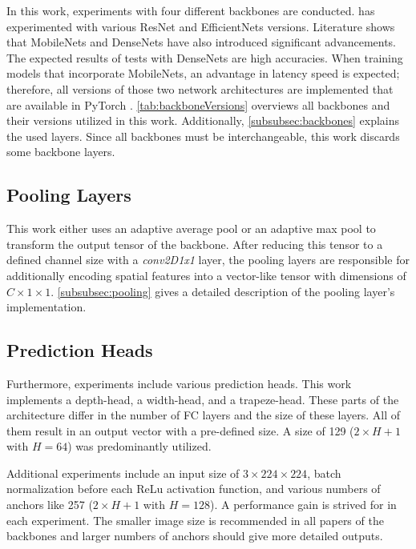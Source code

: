 In this work, experiments with four different backbones are conducted.
\cite{tepNet2024} has experimented with various ResNet and EfficientNets versions.
Literature shows that MobileNets and DenseNets have also introduced significant advancements.
The expected results of tests with DenseNets are high accuracies.
When training models that incorporate MobileNets, an advantage in latency speed is expected;
therefore, all versions of those two network architectures are implemented that are available in PyTorch \cite{pytorchmobilenetv3} \cite{pytorchdensenet}.
\autoref{tab:backboneVersions} overviews all backbones and their versions utilized in this work.
Additionally, \autoref{subsubsec:backbones} explains the used layers.
Since all backbones must be interchangeable, this work discards some backbone layers.

\subsection{Pooling Layers}

This work either uses an adaptive average pool or an adaptive max pool to transform the output tensor of the backbone.
After reducing this tensor to a defined channel size with a \textit{conv2D1x1} layer, the pooling layers are responsible for additionally encoding spatial features into a vector-like tensor with dimensions of $C \times 1 \times 1$.
\autoref{subsubsec:pooling} gives a detailed description of the pooling layer's implementation.

\subsection{Prediction Heads}

Furthermore, experiments include various prediction heads.
This work implements a depth-head, a width-head, and a trapeze-head.
These parts of the architecture differ in the number of \ac{FC} layers and the size of these layers.
All of them result in an output vector with a pre-defined size.
A size of 129 ($2 \times H + 1$ with $H = 64$) was predominantly utilized.

\vspace{0.5cm}

\noindent Additional experiments include an input size of $3 \times 224 \times 224$, batch normalization before each ReLu activation function, and various numbers of anchors like 257 ($2 \times H + 1$ with $H = 128$).
A performance gain is strived for in each experiment.
The smaller image size is recommended in all papers of the backbones and larger numbers of anchors should give more detailed outputs.
 
